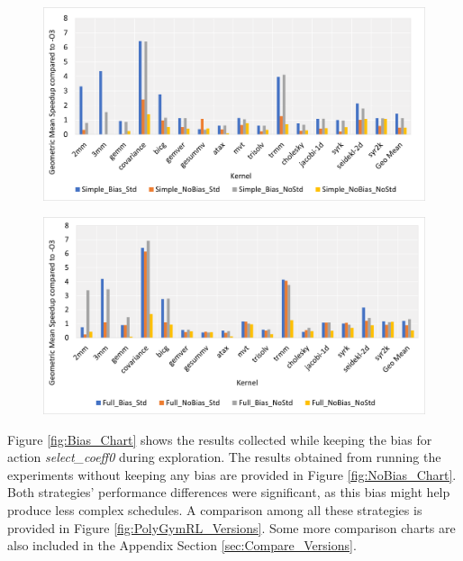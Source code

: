 \documentclass[logo,msc]{infthesis}           %
\begin{document}
\begin{figure}
\centering
\begin{minipage}{.45\linewidth}
  \includegraphics[width=\linewidth]{Images/Simple_Chart.png}
  \label{fig:Simple_Chart}
\end{minipage}
\hspace{.05\linewidth}
\begin{minipage}{.45\linewidth}
  \includegraphics[width=\linewidth]{Images/NoSimple_Chart.png}
  \label{fig:NoSimple_Chart}
\end{minipage}
\end{figure}

Figure \ref{fig:Bias_Chart} shows the results collected while keeping the bias for action \textit{select\_coeff0} during exploration. The results obtained from running the experiments without keeping any bias are provided in Figure \ref{fig:NoBias_Chart}. Both strategies' performance differences were significant, as this bias might help produce less complex schedules. A comparison among all these strategies is provided in Figure \ref{fig:PolyGymRL_Versions}. Some more comparison charts are also included in the Appendix Section \ref{sec:Compare_Versions}.
\end{document}
